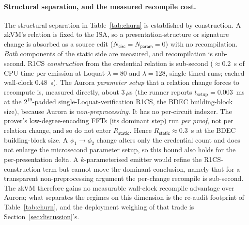 \paragraph{Structural separation, and the measured recompile cost.}
The structural separation in Table~\ref{tab:churn} is established by construction. A zkVM's relation is fixed to the ISA, so a presentation-structure or signature change is absorbed as a source edit ($N_{\mathsf{circ}}=N_{\mathsf{param}}=0$) with no recompilation. \emph{Both} components of the static side are measured, and recompilation is sub-second. R1CS \emph{construction} from the credential relation is sub-second (${\approx}0.2$~s of CPU time per emission at Loquat-$\lambda{=}80$ and $\lambda{=}128$, single timed runs; cached wall-clock $0.48$~s). The Aurora \emph{parameter setup} that a relation change forces to recompute is, measured directly, about $3\,\mu$s (the runner reports $t_{\mathrm{setup}}=0.003$~ms at the $2^{19}$-padded single-Loquat-verification R1CS, the BDEC building-block size), because Aurora is \emph{non-preprocessing}. It has no per-circuit indexer. The prover's low-degree-encoding FFTs (its dominant step) run \emph{per proof}, not per relation change, and so do not enter $R_{\mathsf{static}}$. Hence $R_{\mathsf{static}}\approx 0.3$~s at the BDEC building-block size. A $\phi_1\!\to\!\phi_2$ change alters only the credential count and does not enlarge the microsecond parameter setup, so this bound also holds for the per-presentation delta. A $k$-parameterised emitter would refine the R1CS-construction term but cannot move the dominant conclusion, namely that for a transparent non-preprocessing argument the per-change recompile is sub-second. The zkVM therefore gains no measurable wall-clock recompile advantage over Aurora; what separates the regimes on this dimension is the re-audit footprint of Table~\ref{tab:churn}, and the deployment weighing of that trade is Section~\ref{sec:discussion}'s.

